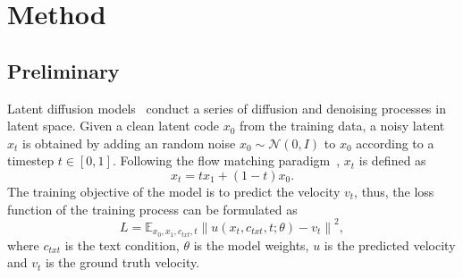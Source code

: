 \section{Method}
\subsection{Preliminary}
Latent diffusion models~\cite{rombach2022high, ho2020denoising, peebles2023scalable} conduct a series of diffusion and denoising processes in latent space. 
%
Given a clean latent code $x_0$ from the training data, a noisy latent $x_t$ is obtained by adding an random noise $x_0\sim \mathcal{N}(0, I)$ to $x_0$ according to a timestep $t\in [0, 1]$. 
%
Following the flow matching paradigm~\cite{lipman2023flow,esser2024scaling}, $x_t$ is defined as
%
\begin{equation}  
x_t = t x_1 + (1 - t) x_0.
\end{equation}
%
The training objective of the model is to predict the velocity $v_t$, thus, the loss function of the training process can be formulated as
%
\begin{equation}  
L = \mathbb{E}_{x_0, x_1, c_{txt}, t} \left\lVert u(x_t, c_{txt}, t; \theta) - v_t \right\rVert^2,
\end{equation}
%
where $c_{txt}$ is the text condition, $\theta$ is the model weights, $u$ is the predicted velocity and $v_t$ is the ground truth velocity.




